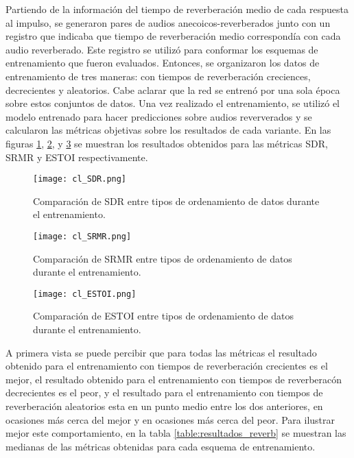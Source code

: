 Partiendo de la información del tiempo de reverberación medio de cada respuesta al impulso, se generaron pares de audios anecoicos-reverberados junto con un registro que indicaba que tiempo de reverberación medio correspondía con cada audio reverberado. Este registro se utilizó para conformar los esquemas de entrenamiento que fueron evaluados. Entonces, se organizaron los datos de entrenamiento de tres maneras: con tiempos de reverberación creciences, decrecientes y aleatorios. Cabe aclarar que la red se entrenó por una sola época sobre estos conjuntos de datos. Una vez realizado el entrenamiento, se utilizó el modelo entrenado para hacer predicciones sobre audios reververados y se calcularon las métricas objetivas sobre los resultados de cada variante. En las figuras \ref{fig:cl_sdr}, \ref{fig:cl_srmr}, y \ref{fig:cl_estoi} se muestran los resultados obtenidos para las métricas SDR, SRMR y ESTOI respectivamente. 

\begin{figure}[H]
	\centering{}
	\texttt{[image: cl\_SDR.png]}
	\caption{Comparación de SDR entre tipos de ordenamiento de datos durante el entrenamiento.}
	\label{fig:cl_sdr}
\end{figure}

\begin{figure}[H]
	\centering{}
	\texttt{[image: cl\_SRMR.png]}
	\caption{Comparación de SRMR entre tipos de ordenamiento de datos durante el entrenamiento.}
	\label{fig:cl_srmr}
\end{figure}

\begin{figure}[H]
	\centering{}
	\texttt{[image: cl\_ESTOI.png]}
	\caption{Comparación de ESTOI entre tipos de ordenamiento de datos durante el entrenamiento.}
	\label{fig:cl_estoi}
\end{figure}

A primera vista se puede percibir que para todas las métricas el resultado obtenido para el entrenamiento con tiempos de reverberación crecientes es el mejor, el resultado obtenido para el entrenamiento con tiempos de reverberacón decrecientes es el peor, y el resultado para el entrenamiento con tiempos de reverberación aleatorios esta en un punto medio entre los dos anteriores, en ocasiones más cerca del mejor y en ocasiones más cerca del peor. Para ilustrar mejor este comportamiento, en la tabla \ref{table:resultados_reverb} se muestran las medianas de las métricas obtenidas para cada esquema de entrenamiento. 


